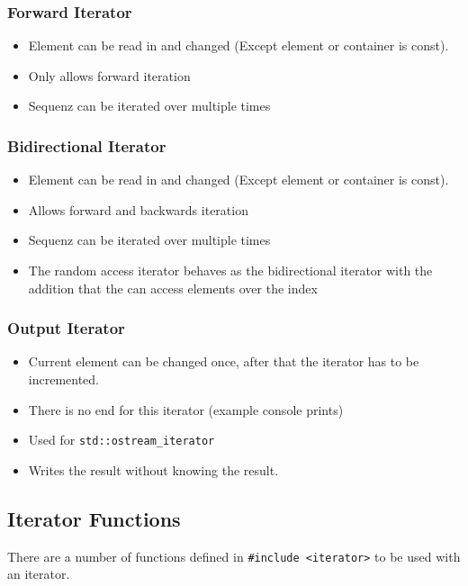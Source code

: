 \subsubsection{Forward Iterator}
\begin{itemize}
  \itemsep -0.5em 
  \item Element can be read in and changed (Except element or container is const).
  \item Only allows forward iteration
  \item Sequenz can be iterated over multiple times
\end{itemize}

\subsubsection{Bidirectional Iterator}
\begin{itemize}
  \itemsep -0.5em 
  \item Element can be read in and changed (Except element or container is const).
  \item Allows forward and backwards iteration
  \item Sequenz can be iterated over multiple times
  \item The random access iterator behaves as the bidirectional iterator with the addition that the can access elements over the index
\end{itemize}

\subsubsection{Output Iterator}
\begin{itemize}
  \itemsep -0.5em 
  \item Current element can be changed once, after that the iterator has to be incremented.
  \item There is no end for this iterator (example console prints)
  \item Used for \lstinline|std::ostream_iterator|
  \item Writes the result without knowing the result.
\end{itemize}

\subsection{Iterator Functions}
There are a number of functions defined in \lstinline|#include <iterator>| to be used with an iterator.

